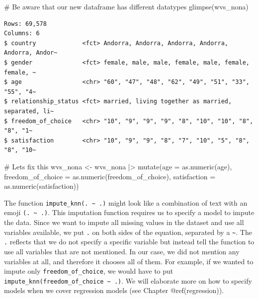 \documentclass[
  letterpaper,
]{krantz}
\makeatletter
\newenvironment{Shaded}{\begin{snugshade}}{\end{snugshade}}
\newcommand{\AttributeTok}[1]{\textcolor[rgb]{0.40,0.45,0.13}{#1}}
\newcommand{\CommentTok}[1]{\textcolor[rgb]{0.37,0.37,0.37}{#1}}
\newcommand{\FunctionTok}[1]{\textcolor[rgb]{0.28,0.35,0.67}{#1}}
\newcommand{\NormalTok}[1]{\textcolor[rgb]{0.00,0.23,0.31}{#1}}
\newcommand{\OtherTok}[1]{\textcolor[rgb]{0.00,0.23,0.31}{#1}}
\newcommand{\SpecialCharTok}[1]{\textcolor[rgb]{0.37,0.37,0.37}{#1}}
\newenvironment{kframe}{%
\medskip{}
\setlength{\fboxsep}{.8em}
 \def\at@end@of@kframe{}%
 \ifinner\ifhmode%
  \def\at@end@of@kframe{\end{minipage}}%
  \begin{minipage}{\columnwidth}%
 \fi\fi%
 \def\FrameCommand##1{\hskip\@totalleftmargin \hskip-\fboxsep
 \colorbox{shadecolor}{##1}\hskip-\fboxsep
     \hskip-\linewidth \hskip-\@totalleftmargin \hskip\columnwidth}%
 \MakeFramed {\advance\hsize-\width
   \@totalleftmargin\z@ \linewidth\hsize
   \@setminipage}}%
 {\par\unskip\endMakeFramed%
 \at@end@of@kframe}
\renewenvironment{Shaded}{\begin{kframe}}{\end{kframe}}
\makeatother
\begin{document}
\begin{Shaded}
\begin{Highlighting}[]
\CommentTok{\# Be aware that our new dataframe has different datatypes}
\FunctionTok{glimpse}\NormalTok{(wvs\_nona)}
\end{Highlighting}
\end{Shaded}

\begin{verbatim}
Rows: 69,578
Columns: 6
$ country             <fct> Andorra, Andorra, Andorra, Andorra, Andorra, Andor~
$ gender              <fct> female, male, male, female, male, female, female, ~
$ age                 <chr> "60", "47", "48", "62", "49", "51", "33", "55", "4~
$ relationship_status <fct> married, living together as married, separated, li~
$ freedom_of_choice   <chr> "10", "9", "9", "9", "8", "10", "10", "8", "8", "1~
$ satisfaction        <chr> "10", "9", "9", "8", "7", "10", "5", "8", "8", "10~
\end{verbatim}

\begin{Shaded}
\begin{Highlighting}[]
\CommentTok{\# Let\textquotesingle{}s fix this}
\NormalTok{wvs\_nona }\OtherTok{\textless{}{-}}
\NormalTok{  wvs\_nona }\SpecialCharTok{|\textgreater{}}
  \FunctionTok{mutate}\NormalTok{(}\AttributeTok{age =} \FunctionTok{as.numeric}\NormalTok{(age),}
         \AttributeTok{freedom\_of\_choice =} \FunctionTok{as.numeric}\NormalTok{(freedom\_of\_choice),}
         \AttributeTok{satisfaction =} \FunctionTok{as.numeric}\NormalTok{(satisfaction))}
\end{Highlighting}
\end{Shaded}

The function \texttt{impute\_knn(.\ \textasciitilde{}\ .)} might look
like a combination of text with an emoji
\texttt{(.\ \textasciitilde{}\ .)}. This imputation function requires us
to specify a model to impute the data. Since we want to impute all
missing values in the dataset and use all variables available, we put
\texttt{.} on both sides of the equation, separated by a
\texttt{\textasciitilde{}}. The \texttt{.} reflects that we do not
specify a specific variable but instead tell the function to use all
variables that are not mentioned. In our case, we did not mention any
variables at all, and therefore it chooses all of them. For example, if
we wanted to impute only \texttt{freedom\_of\_choice}, we would have to
put \texttt{impute\_knn(freedom\_of\_choice\ \textasciitilde{}\ .)}. We
will elaborate more on how to specify models when we cover regression
models (see Chapter @ref(regression)).
\end{document}
